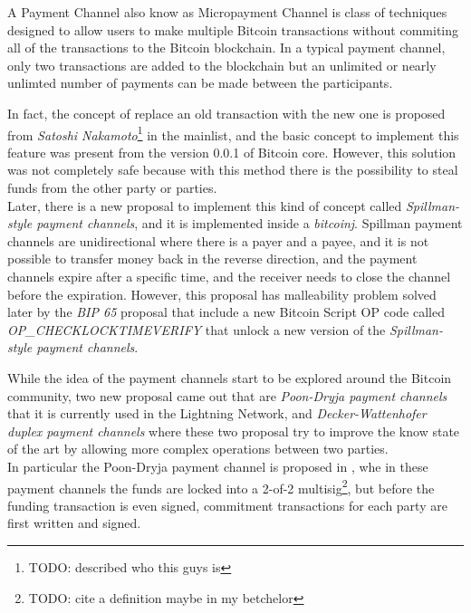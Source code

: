 A Payment Channel also know as Micropayment Channel is class of techniques designed to allow users to make multiple
Bitcoin transactions without commiting all of the transactions to the Bitcoin blockchain. In a typical payment channel,
only two transactions are added to the blockchain but an unlimited or nearly unlimted number of payments
can be made between the participants.

In fact, the concept of replace an old transaction with the new one is proposed from \emph{Satoshi Nakamoto}\footnote{TODO: described who this guys is} in the mainlist\cite{payment-channels-satoshi}, and
the basic concept to implement this feature was present from the version 0.0.1 of Bitcoin core. However, this solution
was not completely safe because with this method there is the possibility to steal funds from the other party or parties.\\

Later, there is a new proposal to implement this kind of concept called \emph{Spillman-style payment channels}, and it is
implemented inside a \emph{bitcoinj}\cite{bitcoinj-impl}. Spillman payment channels are unidirectional where
there is a payer and a payee, and it is not possible to transfer money back in the reverse direction, and the payment
channels expire after a specific time, and the receiver needs to close the channel before the expiration. However, this
proposal has malleability problem solved later by the \emph{BIP  65}\cite{bip65} proposal that include a new Bitcoin Script OP code
called \emph{OP\_CHECKLOCKTIMEVERIFY} that unlock a new version of the \emph{Spillman-style payment channels}.

While the idea of the payment channels start to be explored around the Bitcoin community, two new proposal came out that are
\emph{Poon-Dryja payment channels}\cite{lightning-network-paper} that it is currently used in the Lightning Network,
and \emph{Decker-Wattenhofer duplex payment channels}\cite{Decker2015fast} where these two proposal try to improve the know state
of the art by allowing more complex operations between two parties.\\

In particular the Poon-Dryja payment channel is proposed in \cite{lightning-network-paper}, whe in these payment channels
the funds are locked into a 2-of-2 multisig\footnote{TODO: cite a definition maybe in my betchelor},
but before the funding transaction is even signed, commitment transactions for each party are first written and signed.

